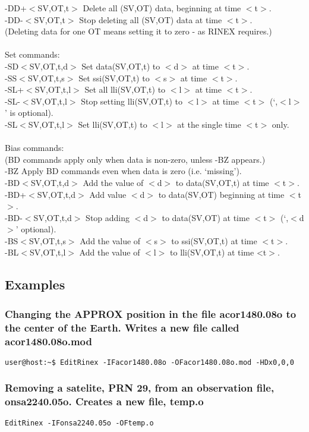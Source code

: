 \begin{\outputsize}
 -DD+$<$SV,OT,t$>$   Delete all (SV,OT) data, beginning at time $<$t$>$.\\
 -DD-$<$SV,OT,t$>$   Stop deleting all (SV,OT) data at time $<$t$>$.\\
     (Deleting data for one OT means setting it to zero - as RINEX requires.)\\
\\
 Set commands:\\
 -SD$<$SV,OT,t,d$>$  Set data(SV,OT,t) to $<$d$>$ at time $<$t$>$.\\
 -SS$<$SV,OT,t,s$>$  Set ssi(SV,OT,t) to $<$s$>$ at time $<$t$>$.\\
 -SL+$<$SV,OT,t,l$>$ Set all lli(SV,OT,t) to $<$l$>$ at time $<$t$>$.\\
 -SL-$<$SV,OT,t,l$>$ Stop setting lli(SV,OT,t) to $<$l$>$ at time $<$t$>$ (`,$<$l$>$' is optional).\\
 -SL$<$SV,OT,t,l$>$  Set lli(SV,OT,t) to $<$l$>$ at the single time $<$t$>$ only.\\
\\
 Bias commands:\\
  (BD commands apply only when data is non-zero, unless -BZ appears.)\\
 -BZ             Apply BD commands even when data is zero (i.e. `missing').\\
 -BD$<$SV,OT,t,d$>$  Add the value of $<$d$>$ to data(SV,OT,t) at time $<$t$>$.\\
 -BD+$<$SV,OT,t,d$>$ Add value $<$d$>$ to data(SV,OT) beginning at time $<$t$>$.\\
 -BD-$<$SV,OT,t,d$>$ Stop adding $<$d$>$ to data(SV,OT) at time $<$t$>$ (`,$<$d$>$' optional).\\
 -BS$<$SV,OT,t,s$>$  Add the value of $<$s$>$ to ssi(SV,OT,t) at time $<$t$>$.\\
 -BL$<$SV,OT,t,l$>$  Add the value of $<$l$>$ to lli(SV,OT,t) at time <t$>$.\\
\end{\outputsize}

\subsection{Examples}
\subsubsection{Changing the APPROX position in the file acor1480.08o to the center of the Earth. Writes a new file called acor1480.08o.mod}
\begin{verbatim}
user@host:~$ EditRinex -IFacor1480.08o -OFacor1480.08o.mod -HDx0,0,0 
\end{verbatim}

\subsubsection{Removing a satelite, PRN 29, from an observation file, onsa2240.05o. Creates a new file, temp.o}
\begin{verbatim}
EditRinex -IFonsa2240.05o -OFtemp.o 
\end{verbatim}
%

